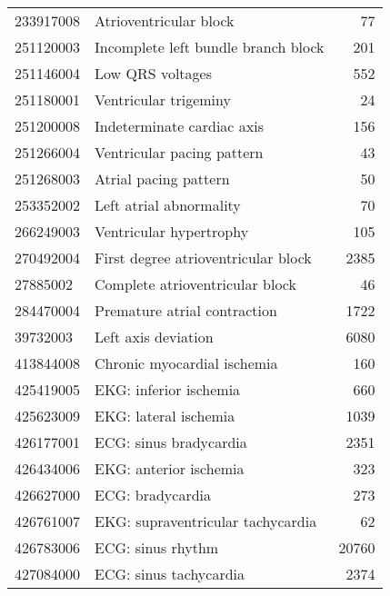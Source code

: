 \begin{tabular}{llr}
233917008      &                             Atrioventricular block &     77 \\
251120003      &                Incomplete left bundle branch block &    201 \\
251146004      &                                   Low QRS voltages &    552 \\
251180001      &                              Ventricular trigeminy &     24 \\
251200008      &                         Indeterminate cardiac axis &    156 \\
251266004      &                         Ventricular pacing pattern &     43 \\
251268003      &                              Atrial pacing pattern &     50 \\
253352002      &                            Left atrial abnormality &     70 \\
266249003      &                            Ventricular hypertrophy &    105 \\
270492004      &                First degree atrioventricular block &   2385 \\
27885002       &                    Complete atrioventricular block &     46 \\
284470004      &                       Premature atrial contraction &   1722 \\
39732003       &                                Left axis deviation &   6080 \\
413844008      &                        Chronic myocardial ischemia &    160 \\
425419005      &                             EKG: inferior ischemia &    660 \\
425623009      &                              EKG: lateral ischemia &   1039 \\
426177001      &                             ECG: sinus bradycardia &   2351 \\
426434006      &                             EKG: anterior ischemia &    323 \\
426627000      &                                   ECG: bradycardia &    273 \\
426761007      &                  EKG: supraventricular tachycardia &     62 \\
426783006      &                                  ECG: sinus rhythm &  20760 \\
427084000      &                             ECG: sinus tachycardia &   2374 \\

\end{tabular}
